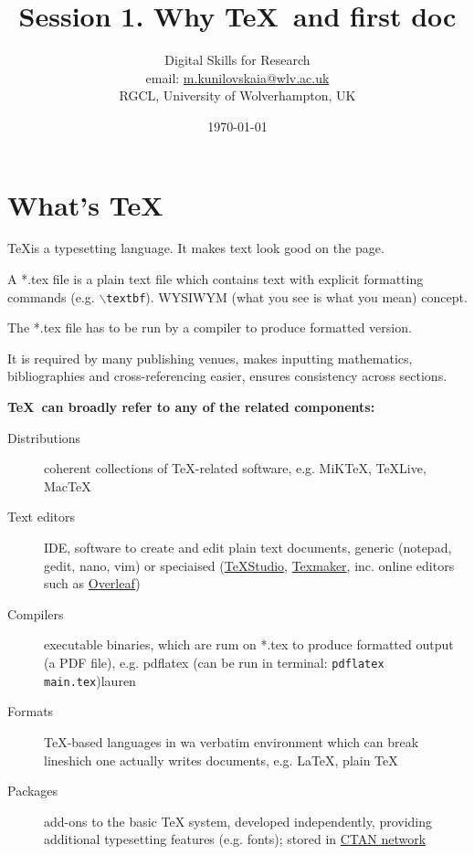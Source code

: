 \documentclass[a4paper,11pt]{article}  %
\title{Session 1. Why \TeX~and first doc}
\author{Digital Skills for Research \\ 
	email: \href{m.kunilovskaia@wlv.ac.uk}{m.kunilovskaia@wlv.ac.uk} \\ 
	RGCL, University of Wolverhampton, UK}
\date{\today}
\begin{document}
\maketitle

\tableofcontents


\section{What's \TeX}
\begin{tcolorbox}[width=\textwidth,colback={yellow!50!white}]
	\TeX is a typesetting language. It makes text look good on the page. 
	\medskip
	
	A *.tex file is a plain text file which contains text with explicit formatting commands (e.g. \texttt{$\backslash$textbf}). WYSIWYM (what you see is what you mean) concept.
	
	The *.tex file has to be run by a compiler to produce formatted version.
	\medskip
	
	It is required by many publishing venues, makes inputting mathematics, bibliographies and cross-referencing easier, ensures consistency across sections.
	
\end{tcolorbox}   

\vspace{1em}

\textbf{\Large{\TeX~can broadly refer to any of the related components:}}

\begin{description}
	\item[Distributions] coherent collections of TeX-related software, e.g. MiKTeX, TeXLive, MacTeX
	\item[Text editors] IDE, software to create and edit plain text documents, generic (notepad, gedit, nano, vim) or speciaised (\href{http://texstudio.sourceforge.net/}{TeXStudio}, \href{https://www.xm1math.net/texmaker/}{Texmaker}, inc. online editors such as \href{https://www.overleaf.com}{Overleaf})
	\item[Compilers] executable binaries, which are rum on *.tex to produce formatted output (a PDF file), e.g. pdflatex (can be run in terminal: \texttt{pdflatex main.tex})lauren
	\item[Formats] TeX-based languages in wa verbatim environment which can break lineshich one actually writes documents, e.g. LaTeX, plain TeX
	\item[Packages] add-ons to the basic TeX system, developed independently, providing additional typesetting features (e.g. fonts); stored in \href{https://ctan.org/}{CTAN network}
\end{description}
\end{document}
